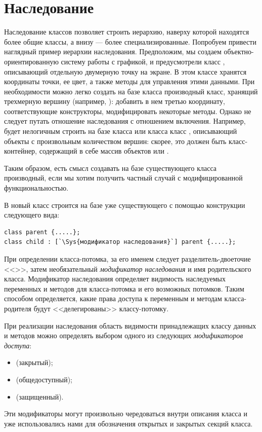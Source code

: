 \section[Наследование]{Наследование}
Наследование классов позволяет строить иерархию, наверху которой находятся более общие классы,
а внизу --- более специализированные. Попробуем привести наглядный пример иерархии наследования. Предположим, мы создаем
объектно-ориентированную систему работы с графикой, и предусмотрели класс , описывающий
отдельную двумерную точку на экране. В этом классе хранятся координаты точки, ее цвет, а также методы для управления
этими данными. При необходимости можно легко создать на базе класса  производный класс,
хранящий трехмерную вершину (например, ): добавить в нем третью координату, соответствующие
конструкторы, модифицировать некоторые методы. Однако не следует путать отношение наследования с отношением включения.
Например, будет нелогичным строить на базе класса  или класса 
класс , описывающий объекты с произвольным количеством вершин: скорее, это должен быть
класс-контейнер, содержащий в себе массив объектов  или .

Таким образом, есть смысл создавать на базе существующего класса производный, если мы хотим получить частный случай с
модифицированной функциональностью. 

В  новый класс строится на базе уже существующего с помощью конструкции следующего вида:
\begin{lstlisting}
class parent {.....};
class child : [`\Sys{модификатор наследования}`] parent {.....};
\end{lstlisting}

При определении класса-потомка, за его именем следует разделитель-двоеточие <<\Sys{:}>>,  затем
необязательный \emph{модификатор наследования} и имя родительского класса. Модификатор
наследования определяет видимость наследуемых переменных и методов для класса-потомка и его возможных потомков. Таким
способом определяется, какие права доступа к переменным и методам класса-родителя будут <<делегированы>> классу-потомку. 

При реализации наследования область видимости принадлежащих классу данных и методов можно определять выбором одного из
следующих \emph{модификаторов доступа}:

\begin{itemize}
\item {} (закрытый);
\item {} (общедоступный); 
\item {} (защищенный).
\end{itemize}
Эти модификаторы могут произвольно чередоваться внутри описания класса и уже использовались нами для обозначения
открытых и закрытых секций класса. 

